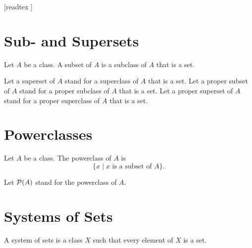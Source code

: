 \documentclass[10pt]{article}
\begin{document}
  \begin{imports}
    \begin{forthel}

      [readtex ]

    \end{forthel}
  \end{imports}


  \section{Sub- and Supersets}

  \begin{forthel}
    \begin{definition}
      Let $A$ be a class.
      A subset of $A$ is a subclass of $A$ that is a set.
    \end{definition}

    Let a superset of $A$ stand for a superclass of $A$ that is a set.
    Let a proper subset of $A$ stand for a proper subclass of $A$ that is a set.
    Let a proper superset of $A$ stand for a proper superclass of $A$ that is a
    set.
  \end{forthel}


  \section{Powerclasses}

  \begin{forthel}
    \begin{definition}
      Let $A$ be a class.
      The powerclass of $A$ is
      \[ \{ x \mid \text{$x$ is a subset of $A$} \}. \]
    \end{definition}

    Let $\mathcal{P}(A)$ stand for the powerclass of $A$.
  \end{forthel}


  \section{Systems of Sets}

  \begin{forthel}
    \begin{definition}
      A system of sets is a class $X$ such that every element of $X$ is a set.
    \end{definition}
  \end{forthel}
\end{document}
